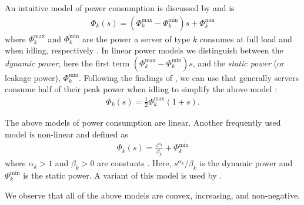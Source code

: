 An intuitive model of power consumption is discussed by \citeauthor*{Dayarathna2016} and \citeauthor*{Ismail2020} is \begin{align*}
    \Phi_k(s) = (\Phi_k^{\text{max}} - \Phi_k^{\text{min}})s + \Phi_k^{\text{min}}
\end{align*} where $\Phi_k^{\text{max}}$ and $\Phi_k^{\text{min}}$ are the power a server of type $k$ consumes at full load and when idling, respectively \cite{Dayarathna2016, Ismail2020}. In linear power models we distinguish between the \emph{dynamic power}, here the first term $(\Phi_k^{\text{max}} - \Phi_k^{\text{min}})s$, and the \emph{static power} (or leakage power), $\Phi_k^{\text{min}}$. Following the findings of \citeauthor*{Barroso2007}, we can use that generally servers consume half of their peak power when idling to simplify the above model \cite{Barroso2007, Ismail2020}: \begin{align*}
    \Phi_k(s) = \frac{1}{2} \Phi_k^{\text{max}} (1 + s).
\end{align*}

The above models of power consumption are linear. Another frequently used model is non-linear and defined as \begin{align*}
    \Phi_k(s) = \frac{s^{\alpha_k}}{\beta_k} + \Phi_k^{\text{min}}
\end{align*} where $\alpha_k > 1$ and $\beta_k > 0$ are constants \cite{Dayarathna2016}. Here, $s^{\alpha_k}/\beta_k$ is the dynamic power and $\Phi_k^{\text{min}}$ is the static power. A variant of this model is used by \citeauthor*{Bansal2015} \cite{Bansal2015}.

We observe that all of the above models are convex, increasing, and non-negative.

